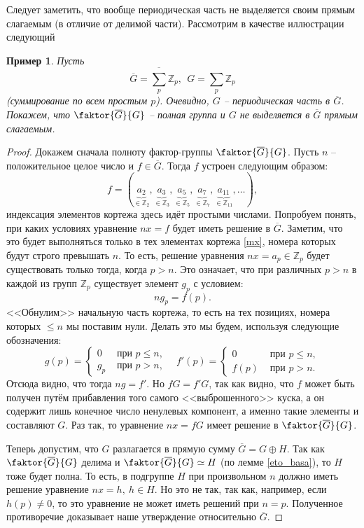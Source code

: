 \documentclass{article}
\newtheorem{example}{Пример}[section]
\begin{document}
Следует заметить, что вообще периодическая часть не выделяется своим прямым слагаемым (в отличие от делимой части). Рассмотрим в качестве иллюстрации следующий
\begin{example}
    Пусть
    \[
        \overline{G} = \overline{\sum_{p}} \mathbb{Z}_p, \ \ G = \sum_{p} \mathbb{Z}_p
    \]
    (суммирование по всем простым $p$). Очевидно, $G$ -- периодическая часть в $\overline{G}$. Покажем, что $\faktor{\overline{G}}{G}$ -- полная группа и $G$ не выделяется в $\overline{G}$ прямым слагаемым.
\end{example}
\begin{proof}
    Докажем сначала полноту фактор-группы $\faktor{\overline{G}}{G}$. Пусть $n$ -- положительное целое число и $f \in \overline{G}$. Тогда $f$ устроен следующим образом:
    \begin{equation} \tag{*} \label{mx}
        f = (\underbrace{a_2}_{\in \mathbb{Z}_2}, \underbrace{a_3}_{\in \mathbb{Z}_3}, \underbrace{a_5}_{\in \mathbb{Z}_5}, \underbrace{a_7}_{\in \mathbb{Z}_7}, \underbrace{a_{11}}_{\in \mathbb{Z}_{11}}, \ldots),
    \end{equation}
    индексация элементов кортежа здесь идёт простыми числами. Попробуем понять, при каких условиях уравнение $nx = f$ будет иметь решение в $\overline{G}$.
    Заметим, что это будет выполняться только в тех элементах кортежа \eqref{mx}, номера которых будут строго превышать $n$. То есть, решение уравнения $nx = a_p \in \mathbb{Z}_p$ будет существовать только тогда, когда $p > n$. Это означает, что при различных $p > n$ в каждой из групп $\mathbb{Z}_p$ существует элемент $g_p$ с условием:
    \[
        n g_p = f(p).
    \]
    <<Обнулим>> начальную часть кортежа, то есть на тех позициях, номера которых $\leqslant n$ мы поставим нули. Делать это мы будем, используя следующие обозначения:
    \[
        g(p) = 
        \begin{cases}
          0 & \text{ при } p \leqslant n, \\
          g_p & \text{ при } p > n,
       \end{cases}
       \ \ \ \
        f'(p) = 
        \begin{cases}
          0 & \text{ при } p \leqslant n, \\
          f(p) & \text{ при } p > n.
       \end{cases}
    \]
    Отсюда видно, что тогда $ng = f'$. Но $fG = f'G$, так как видно, что $f$ может быть получен путём прибавления того самого <<выброшенного>> куска, а он содержит лишь конечное число ненулевых компонент, а именно такие элементы и составляют $G$. Раз так, то уравнение $nx = fG$ имеет решение в $\faktor{\overline{G}}{G}$.

    Теперь допустим, что $G$ разлагается в прямую сумму $\overline{G} = G \oplus H$. Так как $\faktor{\overline{G}}{G}$ делима и $\faktor{\overline{G}}{G} \simeq H$ (по лемме \ref{eto_basa}), то $H$ тоже будет полна. То есть, в подгруппе $H$ при произвольном $n$ должно иметь решение уравнение $nx = h, \ h \in H$. Но это не так, так как, например, если $h(p) \neq 0$, то это уравнение не может иметь решений при $n = p$. Полученное противоречие доказывает наше утверждение относительно $\overline{G}$.
\end{proof}
\end{document}
